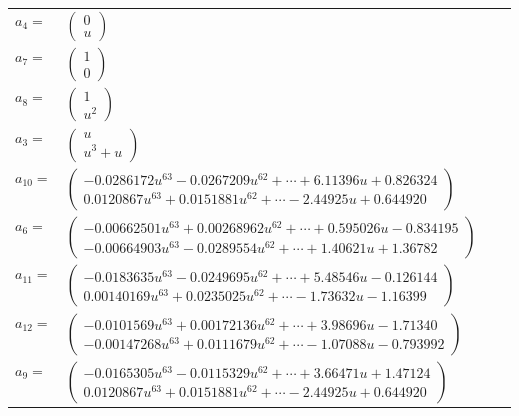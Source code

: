 \documentclass[1p]{elsarticle_modified}
\theoremstyle{definition}
\begin{document}
\begin{tabular}{m{7pt} m{180pt} m{7pt} m{180pt} }
\flushright $a_{4}=$&$\begin{pmatrix}0\\u\end{pmatrix}$ \\
\flushright $a_{7}=$&$\begin{pmatrix}1\\0\end{pmatrix}$ \\
\flushright $a_{8}=$&$\begin{pmatrix}1\\u^2\end{pmatrix}$ \\
\flushright $a_{3}=$&$\begin{pmatrix}u\\u^3+u\end{pmatrix}$ \\
\flushright $a_{10}=$&$\begin{pmatrix}-0.0286172 u^{63}-0.0267209 u^{62}+\cdots+6.11396 u+0.826324\\0.0120867 u^{63}+0.0151881 u^{62}+\cdots-2.44925 u+0.644920\end{pmatrix}$ \\
\flushright $a_{6}=$&$\begin{pmatrix}-0.00662501 u^{63}+0.00268962 u^{62}+\cdots+0.595026 u-0.834195\\-0.00664903 u^{63}-0.0289554 u^{62}+\cdots+1.40621 u+1.36782\end{pmatrix}$ \\
\flushright $a_{11}=$&$\begin{pmatrix}-0.0183635 u^{63}-0.0249695 u^{62}+\cdots+5.48546 u-0.126144\\0.00140169 u^{63}+0.0235025 u^{62}+\cdots-1.73632 u-1.16399\end{pmatrix}$ \\
\flushright $a_{12}=$&$\begin{pmatrix}-0.0101569 u^{63}+0.00172136 u^{62}+\cdots+3.98696 u-1.71340\\-0.00147268 u^{63}+0.0111679 u^{62}+\cdots-1.07088 u-0.793992\end{pmatrix}$ \\
\flushright $a_{9}=$&$\begin{pmatrix}-0.0165305 u^{63}-0.0115329 u^{62}+\cdots+3.66471 u+1.47124\\0.0120867 u^{63}+0.0151881 u^{62}+\cdots-2.44925 u+0.644920\end{pmatrix}$ \\

\end{tabular}
\end{document}
